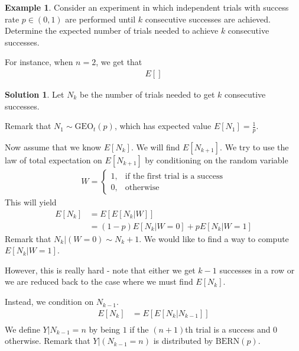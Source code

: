\documentclass[11pt]{amsart}
\theoremstyle{definition}
\newtheorem{example}[theorem]{Example}
\newtheorem{solution}[theorem]{Solution}
\numberwithin{equation}{section}
\begin{document}
 \begin{example}
     Consider an experiment in which independent trials with success rate $p\in(0,1)$ are performed until $k$ consecutive successes are achieved. Determine the expected number of trials needed to achieve $k$ consecutive successes.

     For instance, when $n=2$, we get that 
     \begin{align*}
         E[]
     \end{align*}
 \end{example}
 \addtocounter{theorem}{-1}
 \begin{solution}
     Let $N_k$ be the number of trials needed to get $k$ consecutive successes.

     Remark that $N_1\sim\mathrm{GEO}_t(p)$, which has expected value $E[N_1]=\frac{1}{p}$.

     Now assume that we know $E[N_k]$. We will find $E[N_{k+1}]$. We try to use the law of total expectation on $E[N_{k+1}]$ by conditioning on the random variable
     \begin{align*}
         W=\begin{cases}
             1, & \text{if the first trial is a success}\\
             0, & \text{otherwise}
         \end{cases}
     \end{align*}
     This will yield
     \begin{align*}
         E[N_{k}]&=E[E[N_{k}|W]]\\
         &=(1-p)E[N_k|W=0]+pE[N_k|W=1]
     \end{align*}
     Remark that $N_k|(W=0)\sim N_k+1$. We would like to find a way to compute $E[N_k|W=1]$.

     However, this is really hard - note that either we get $k-1$ successes in a row or we are reduced back to the case where we must find $E[N_k]$.

     Instead, we condition on $N_{k-1}$.
     \begin{align*}
         E[N_k]&=E[E[N_k|N_{k-1}]]\\
     \end{align*}
     We define $Y|N_{k-1}=n$ by being $1$ if the $(n+1)$th trial is a success and 0 otherwise. Remark that $Y|(N_{k-1}=n)$ is distributed by $\mathrm{BERN}(p)$.


\end{solution}
\end{document}
